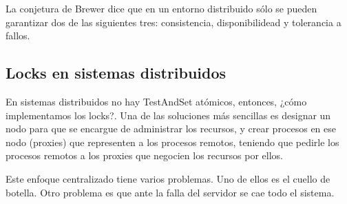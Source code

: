 \documentclass{article}
\begin{document}
La conjetura de Brewer dice que en un entorno distribuido s\'olo se pueden garantizar dos de las siguientes tres: consistencia, disponibilidead y tolerancia a fallos.

\subsection{Locks en sistemas distribuidos}

En sistemas distribuidos no hay TestAndSet at\'omicos, entonces, ¿c\'omo implementamos los locks?. Una de las soluciones m\'as sencillas es designar un nodo para que se encargue de administrar los recursos, y crear procesos en ese nodo (proxies) que representen a los procesos remotos, teniendo que pedirle los procesos remotos a los proxies que negocien los recursos por ellos.

Este enfoque centralizado tiene varios problemas. Uno de ellos es el cuello de botella. Otro problema es que ante la falla del servidor se cae todo el sistema.
\end{document}
